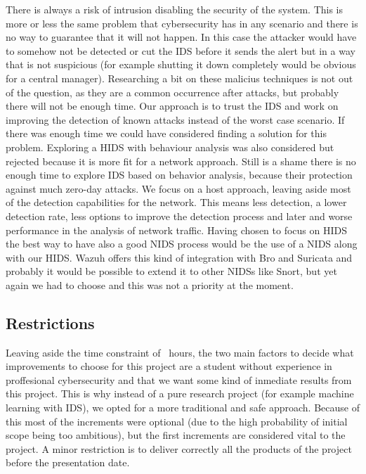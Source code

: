 \linej
\linej
There is always a risk of intrusion disabling the security of the system.
This is more or less the same problem that cybersecurity has in any scenario and there is no way to guarantee that it will not happen.
In this case the attacker would have to somehow not be detected or cut the IDS before it sends the alert but in a way that is not suspicious (for example shutting it down completely would be obvious for a central manager).
Researching a bit on these malicius techniques is not out of the question, as they are a common occurrence after attacks, but probably there will not be enough time.
\linej
Our approach is to trust the IDS and work on improving the detection of known attacks instead of the worst case scenario.
If there was enough time we could have considered finding a solution for this problem.
\linej
\linej
Exploring a HIDS with behaviour analysis was also considered but rejected because it is more fit for a network approach. Still is a shame there is no enough time to explore IDS based on behavior analysis, because their protection against much zero-day attacks.
\linej
\linej
We focus on a host approach, leaving aside most of the detection capabilities for the network. This means less detection, a lower detection rate, less options to improve the detection process and later and worse performance in the analysis of network traffic. Having chosen to focus on HIDS the best way to have also a good NIDS process would be the use of a NIDS along with our HIDS.
\linej
Wazuh offers this kind of integration with Bro and Suricata and probably it would be possible to extend it to other NIDSs like Snort, but yet again we had to choose and this was not a priority at the moment.

\subsection{Restrictions}
Leaving aside the time constraint of \projecthours \ hours, the two main factors to decide what improvements to choose for this project are a student without experience in proffesional cybersecurity and that we want some kind of inmediate results from this project.
This is why instead of a pure research project (for example machine learning with IDS), we opted for a more traditional and safe approach.
Because of this most of the increments were optional (due to the high probability of initial scope being too ambitious), but the first increments are considered vital to the project.
\linej
\linej
A minor restriction is to deliver correctly all the products of the project before the presentation date.


